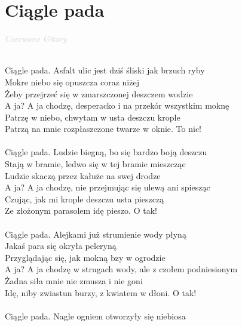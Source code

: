 \documentclass[a5paper, 10pt]{book}
\begin{document}
\section{Ciągle pada}\textcolor{lightgray}{\textit{Czerwone Gitary}}\\~\\
\begin{minipage}[t]{0.8\textwidth}
  Ciągle pada. Asfalt ulic jest dziś śliski jak brzuch ryby\\
  Mokre niebo się opuszcza coraz niżej\\
  Żeby przejrzeć się w zmarszczonej deszczem wodzie\\
  A ja? A ja chodzę, desperacko i na przekór wszystkim moknę\\
  Patrzę w niebo, chwytam w usta deszczu krople\\
  Patrzą na mnie rozpłaszczone twarze w oknie. To nic!\\
  \\
  \hspace*{3mm}Ciągle pada. Ludzie biegną, bo się bardzo boją deszczu\\
  \hspace*{3mm}Stają w bramie, ledwo się w tej bramie mieszcząc\\
  \hspace*{3mm}Ludzie skaczą przez kałuże na swej drodze\\
  \hspace*{3mm}A ja? A ja chodzę, nie przejmując się ulewą ani spiesząc\\
  \hspace*{3mm}Czując, jak mi krople deszczu usta pieszczą\\
  \hspace*{3mm}Ze złożonym parasolem idę pieszo. O tak!\\
  \\
  Ciągle pada. Alejkami już strumienie wody płyną\\
  Jakaś para się okryła peleryną\\
  Przyglądając się, jak mokną bzy w ogrodzie\\
  A ja? A ja chodzę w strugach wody, ale z czołem podniesionym\\
  Żadna siła mnie nie zmusza i nie goni\\
  Idę, niby zwiastun burzy, z kwiatem w dłoni. O tak!\\
  \\
  \hspace*{3mm}Ciągle pada. Nagle ogniem otworzyły się niebiosa\\

\end{minipage}
\end{document}

